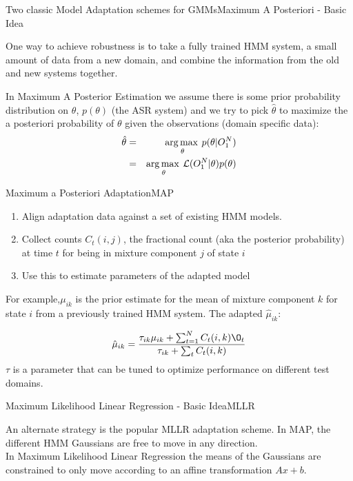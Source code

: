 \begin{frame}{Two classic Model Adaptation schemes for GMMs}{Maximum A Posteriori  - Basic Idea}

One way to achieve robustness is to take a fully trained HMM
system, a small amount of data from a new domain, and combine the
information from the old and new systems together. 

In Maximum A Posterior Estimation we assume there is some prior
probability distribution on $\theta$, $p(\theta)$ (the ASR system) and we try to
pick $\hat{\theta}$ to maximize the a posteriori probability of $\theta$ given the
observations (domain specific data):
\begin{eqnarray*}
\hat{\theta} & = & \operatorname*{arg\,max\:}_{\theta} p(\theta|O_{1}^{N} ) \\
& = & \operatorname*{arg\,max\:}_{\theta} \mathcal{L}(O_{1}^{N}|\theta) p(\theta)
\end{eqnarray*}

\end{frame}

\begin{frame}{Maximum a Posteriori Adaptation}{MAP}

\begin{enumerate}
\item Align adaptation data against a set of existing HMM models.
\item Collect counts $C_t(i,j)$, the fractional count (aka the posterior probability)  at time $t$ for being in mixture component $j$ of state $i$
\item Use this to estimate parameters of the adapted model
\end{enumerate}

For example,$\mu_{ik}$ is  the prior estimate for the mean of mixture
component $k$ for state $i$ from a previously trained HMM system. The adapted $\hat{\mu}_{ik}$:

\[ \hat{\mu}_{ik} =
  \frac{\tau_{ik}\mu_{ik}+\sum_{t=1}^{N}C_{t}(i,k)\O_t}{\tau_{ik}+\sum_{t}C_{t}(i,k)}
  \]
$\tau$ is a parameter that can be tuned to optimize performance on different test domains. 
\end{frame}

\begin{frame}{Maximum Likelihood Linear Regression - Basic Idea}{MLLR}

An alternate strategy is the popular MLLR adaptation scheme. In MAP, the different HMM Gaussians are free to move in any direction. \\
In Maximum Likelihood Linear Regression the means of the Gaussians are constrained to only move according to an affine transformation $Ax+b$.

\end{frame}


